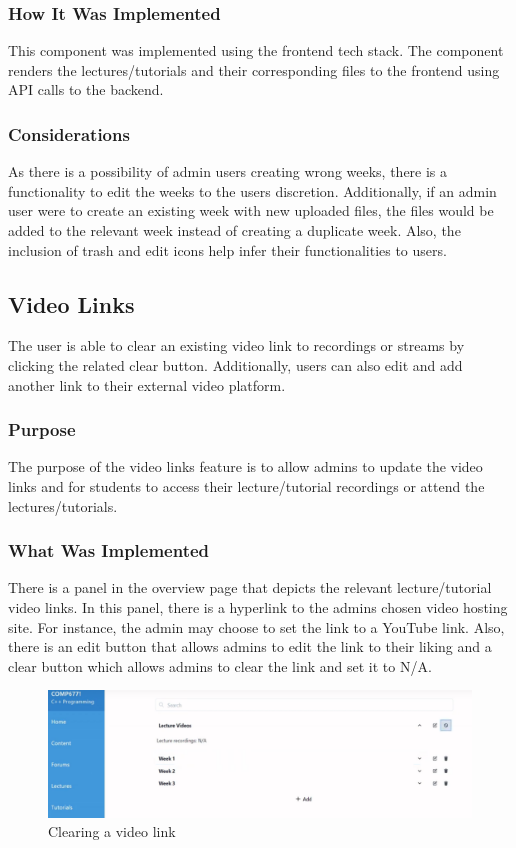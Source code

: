 \subsubsection{How It Was Implemented}
This component was implemented using the frontend tech stack. The component renders the lectures/tutorials and their corresponding files to the frontend using API calls to the backend.

\subsubsection{Considerations}
As there is a possibility of admin users creating wrong weeks, there is a functionality to edit the weeks to the users discretion. Additionally, if an admin user were to create an existing week with new uploaded files, the files would be added to the relevant week instead of creating a duplicate week. Also, the inclusion of trash and edit icons help infer their functionalities to users.

\subsection{Video Links}
The user is able to clear an existing video link to recordings or streams by clicking the related clear button. Additionally, users can also edit and add another link to their external video platform.

\subsubsection{Purpose}
The purpose of the video links feature is to allow admins to update the video links and for students to access their lecture/tutorial recordings or attend the lectures/tutorials.

\subsubsection{What Was Implemented}
There is a panel in the overview page that depicts the relevant lecture/tutorial video links. In this panel, there is a hyperlink to the admins chosen video hosting site. For instance, the admin may choose to set the link to a YouTube link. Also, there is an edit button that allows admins to edit the link to their liking and a clear button which allows admins to clear the link and set it to N/A.

\begin{figure}[h!]
    \includegraphics[scale=0.3]{images/lat-lectures-clear-link.png}
    \centering
    \caption{Clearing a video link}
\end{figure}

